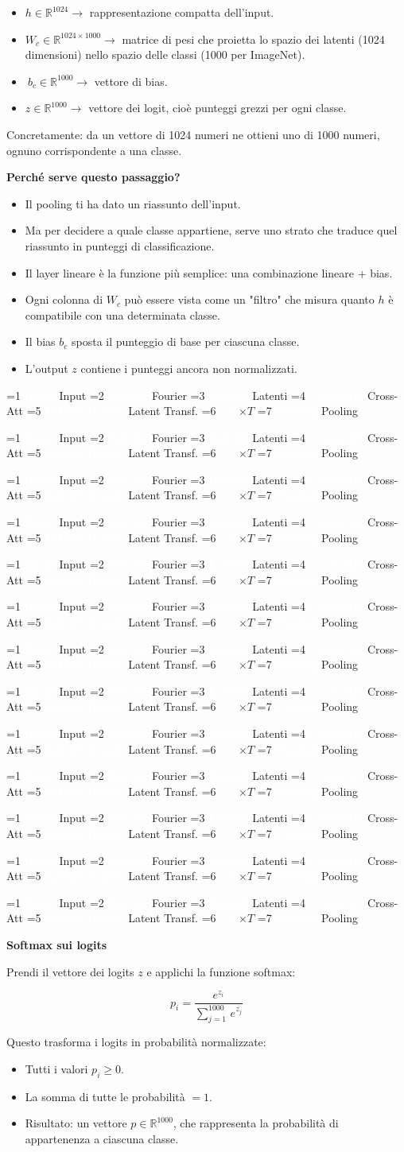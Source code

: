 \documentclass[
  11pt,
]{article}
\newcommand{\pipelinestep}[2]{%
  \ifnum#2=1
    \tikz[baseline=(n.base)]{\node[draw=seccolor, fill=seccolor!15, rounded corners=2pt,
      inner sep=2pt, font=\footnotesize\bfseries] (n) {#1};}%
  \else
    \tikz[baseline=(n.base)]{\node[draw=boxframe, rounded corners=2pt,
      inner sep=2pt, font=\footnotesize] (n) {#1};}%
  \fi
}
\newcommand{\parr}{{\footnotesize\;$\to$\;}}
\newcommand{\pipeline}[1]{%
\begin{tcolorbox}[colback=white, colframe=seccolor!60, boxrule=0.6pt, arc=4pt,
  left=4pt, right=4pt, top=5pt, bottom=5pt, title={\footnotesize\bfseries\color{white} Forward Pass Pipeline}, fonttitle=\footnotesize, coltitle=white, colbacktitle=seccolor!70]
\centering
\pipelinestep{Input}{%
  \ifnum#1=1 1\else 0\fi}%
\parr\pipelinestep{Fourier}{%
  \ifnum#1=2 1\else 0\fi}%
\parr\pipelinestep{Embedding}{%
  \ifnum#1=3 1\else 0\fi}%
\parr\pipelinestep{Latent Array}{%
  \ifnum#1=4 1\else 0\fi}%
\parr\pipelinestep{Cross-Att}{%
  \ifnum#1=5 1\else 0\fi}%
\parr\pipelinestep{Res+MLP}{%
  \ifnum#1=6 1\else 0\fi}%
\\[4pt]
\pipelinestep{Latent Transf.}{%
  \ifnum#1=7 1\else 0\fi}%
\parr\pipelinestep{Res+MLP}{%
  \ifnum#1=8 1\else 0\fi}%
\parr\pipelinestep{$\times T$}{%
  \ifnum#1=9 1\else 0\fi}%
\parr\pipelinestep{Pooling}{%
  \ifnum#1=10 1\else 0\fi}%
\parr\pipelinestep{Classifier}{%
  \ifnum#1=11 1\else 0\fi}%
\parr\pipelinestep{Loss}{%
  \ifnum#1=12 1\else 0\fi}%
\end{tcolorbox}
}
\newcommand{\mystripchip}[3]{%
  \setlength{\fboxsep}{2.8pt}%
  \ifnum#3=#1\relax
    \colorbox{seccolor}{\textcolor{white}{\bfseries #2}}%
  \else
    \colorbox{seccolor!8}{\textcolor{seccolor!55}{#2}}%
  \fi}
\newcommand{\mystriparr}{{\fontsize{8}{8}\selectfont\;\textcolor{seccolor!45}{$\rightarrow$}\;}}
\newcommand{\mystrip}[1]{%
\begin{center}
{\sffamily\fontsize{7.5}{9}\selectfont
\mystripchip{1}{Input}{#1}\mystriparr\mystripchip{2}{Fourier}{#1}\mystriparr\mystripchip{3}{Latenti}{#1}\mystriparr%
\mystripchip{4}{Cross-Att}{#1}\mystriparr\mystripchip{5}{Latent Transf.}{#1}\mystriparr%
\mystripchip{6}{$\times T$}{#1}\mystriparr\mystripchip{7}{Pooling}{#1}}
\end{center}}
\renewcommand{\pipeline}[1]{%
  \ifcase#1\relax
    \mystrip{0}%
    \or\mystrip{1}%
    \or\mystrip{2}%
    \or\mystrip{2}%
    \or\mystrip{3}%
    \or\mystrip{4}%
    \or\mystrip{4}%
    \or\mystrip{5}%
    \or\mystrip{5}%
    \or\mystrip{6}%
    \or\mystrip{7}%
    \or\mystrip{7}%
    \or\mystrip{7}%
  \fi}
\begin{document}
\begin{itemize}
\item
  \(h \in \mathbb{R}^{1024} \rightarrow\) rappresentazione compatta
  dell'input.
\item
  \(W_{c} \in \mathbb{R}^{1024 \times 1000} \rightarrow\) matrice di pesi
  che proietta lo spazio dei latenti (1024 dimensioni) nello spazio delle
  classi (1000 per ImageNet).
\item
  \(\ b_{c} \in \mathbb{R}^{1000} \rightarrow\) vettore di bias.
\item
  \(z \in \mathbb{R}^{1000} \rightarrow\) vettore dei logit, cioè
  punteggi grezzi per ogni classe.
\end{itemize}

Concretamente: da un vettore di 1024 numeri ne ottieni uno di 1000
numeri, ognuno corrispondente a una classe.

\textbf{Perché serve questo passaggio?}

\begin{itemize}
\item
  Il pooling ti ha dato un riassunto dell'input.
\item
  Ma per decidere a quale classe appartiene, serve uno strato che
  traduce quel riassunto in punteggi di classificazione.
\item
  Il layer lineare è la funzione più semplice: una combinazione lineare
  + bias.
\end{itemize}

\begin{itemize}
\item
  Ogni colonna di \(W_{c}\) può essere vista come un "filtro" che misura
  quanto \(h\) è compatibile con una determinata classe.
\item
  Il bias \(b_{c}\) sposta il punteggio di base per ciascuna classe.
\item
  L'output \(z\) contiene i punteggi ancora non
  normalizzati.
\end{itemize}

\pipeline{11}


\textbf{Softmax sui logits}

Prendi il vettore dei logits \(z\) e applichi la funzione softmax:

\[p_{i} = \frac{e^{z_{i}}}{\sum_{j = 1}^{1000}\, e^{z_{j}}}\]

Questo trasforma i logits in probabilità normalizzate:

\begin{itemize}
\item
  Tutti i valori \(p_{i} \geq 0\).
\item
  La somma di tutte le probabilità \(= 1\).
\item
  Risultato: un vettore \(p \in \mathbb{R}^{1000}\), che rappresenta la
  probabilità di appartenenza a ciascuna classe.
\end{itemize}
\end{document}
